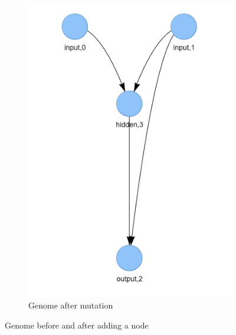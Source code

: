 \documentclass{article}
\begin{document}
\begin{figure}[h]
\begin{subfigure}{.5\textwidth}
      \includegraphics[width=1\linewidth]{third_genome.png}
      \caption{Genome after mutation}
    \end{subfigure}
    \caption{Genome before and after adding a node}
  \end{figure}
\end{document}
